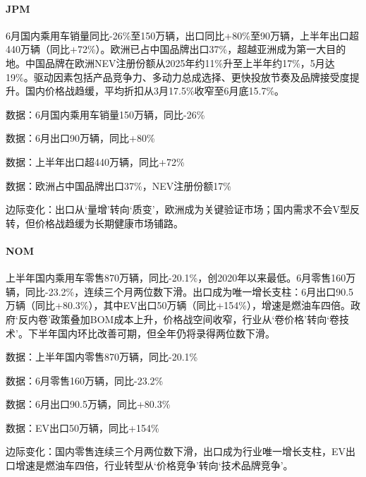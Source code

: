 \documentclass[11pt]{ctexart}
\begin{document}
\paragraph{JPM} 6月国内乘用车销量同比-26\%至150万辆，出口同比+80\%至90万辆，上半年出口超440万辆（同比+72\%）。欧洲已占中国品牌出口37\%，超越亚洲成为第一大目的地。中国品牌在欧洲NEV注册份额从2025年约11\%升至上半年约17\%，5月达19\%。驱动因素包括产品竞争力、多动力总成选择、更快投放节奏及品牌接受度提升。国内价格战趋缓，平均折扣从3月17.5\%收窄至6月底15.7\%。
{\small\color{refgray}数据：6月国内乘用车销量150万辆，同比-26\%\par}
{\small\color{refgray}数据：6月出口90万辆，同比+80\%\par}
{\small\color{refgray}数据：上半年出口超440万辆，同比+72\%\par}
{\small\color{refgray}数据：欧洲占中国品牌出口37\%，NEV注册份额17\%\par}
{\small\color{refgray}边际变化：出口从‘量增’转向‘质变’，欧洲成为关键验证市场；国内需求不会V型反转，但价格战趋缓为长期健康市场铺路。\par}
\paragraph{NOM} 上半年国内乘用车零售870万辆，同比-20.1\%，创2020年以来最低。6月零售160万辆，同比-23.2\%，连续三个月两位数下滑。出口成为唯一增长支柱：6月出口90.5万辆（同比+80.3\%），其中EV出口50万辆（同比+154\%），增速是燃油车四倍。政府‘反内卷’政策叠加BOM成本上升，价格战空间收窄，行业从‘卷价格’转向‘卷技术’。下半年国内环比改善可期，但全年仍将录得两位数下滑。
{\small\color{refgray}数据：上半年国内零售870万辆，同比-20.1\%\par}
{\small\color{refgray}数据：6月零售160万辆，同比-23.2\%\par}
{\small\color{refgray}数据：6月出口90.5万辆，同比+80.3\%\par}
{\small\color{refgray}数据：EV出口50万辆，同比+154\%\par}
{\small\color{refgray}边际变化：国内零售连续三个月两位数下滑，出口成为行业唯一增长支柱，EV出口增速是燃油车四倍，行业转型从‘价格竞争’转向‘技术品牌竞争’。\par}
\end{document}
